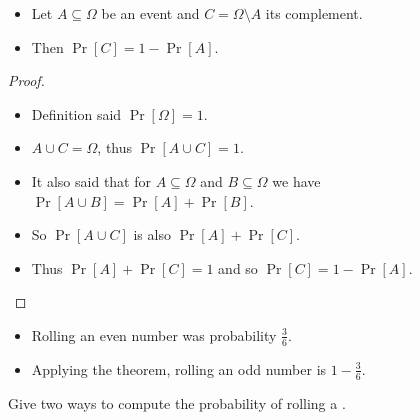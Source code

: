 \documentclass{beamer}
\begin{document}
\begin{frame}
  \begin{theorem}
    \begin{itemize}
      \item Let \(A\subseteq \Omega\) be an event and \(C = \Omega\setminus A\) 
        its complement.
      \item Then \(\Pr[C] = 1 - \Pr[A]\).
    \end{itemize}
  \end{theorem}

  \pause{}

  \begin{proof}
    \begin{itemize}
      \item Definition said \(\Pr[\Omega] = 1\).

        \pause{}

      \item \(A\cup C = \Omega\), thus \(\Pr[A\cup C] = 1\).

        \pause{}

      \item It also said that for \(A\subseteq \Omega\) and \(B\subseteq 
          \Omega\) we have \(\Pr[A\cup B] = \Pr[A] + \Pr[B]\).

        \pause{}

      \item So \(\Pr[A\cup C]\) is also \(\Pr[A] + \Pr[C]\).

        \pause{}

      \item Thus \(\Pr[A] + \Pr[C] = 1\) and so \(\Pr[C] = 1 - \Pr[A]\).
    \end{itemize}
  \end{proof}
\end{frame}

\begin{frame}
  \begin{example}
    \begin{itemize}
      \item Rolling an even number was probability \(\frac{3}{6}\).
      \item Applying the theorem, rolling an odd number is \(1-\frac{3}{6}\).
    \end{itemize}
  \end{example}

  \pause{}

  \begin{exercise}
    Give two ways to compute the probability of rolling a .
  \end{exercise}
\end{frame}
\end{document}

